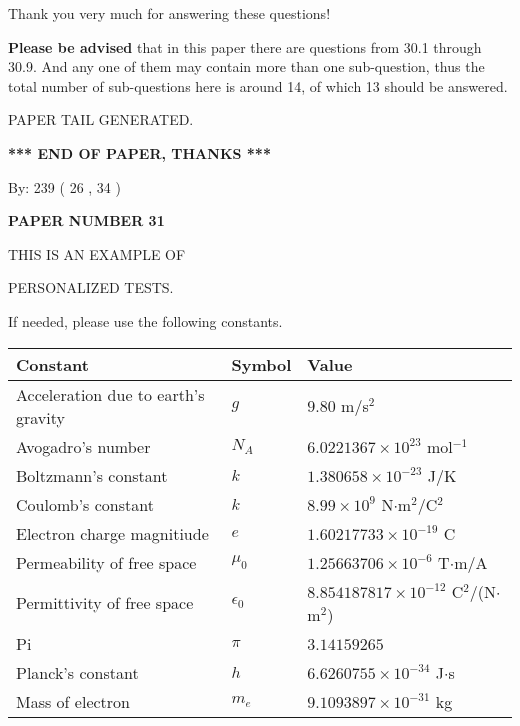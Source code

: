 \documentclass[12pt]{article}
\begin{document}
Thank you very much for answering these questions!
 
{\textbf{\large{Please be advised}}} that in this paper there are questions from
30.1 through
30.9.
And any one of them may contain more than one sub-question, thus the total number
of sub-questions here is around 14, of which
13 should be answered.
 
   
   
\vspace{2.0in} PAPER TAIL GENERATED.
   
   
   
   
\vspace{1.0in} 
{\textbf{\large{ *** END OF PAPER, THANKS *** }}} 
   
   
\hspace{1.0in} By: 
         239 (          26 ,           34 )
   
   
   
   
\newpage 
\setcounter{page}{ 
    31001 } 
   
   
   
   
 {\textbf{ \Large{ PAPER NUMBER           31  }}}
   
   
\vspace{0.2in}
   
   
   
   
   
   
   
   
 \vspace{0.2in}
 
 
{\Huge  THIS IS AN EXAMPLE OF}
 
{\Huge  PERSONALIZED TESTS. }
 
If needed, please use the following constants.
 
 
 
\noindent\begin{tabular}{|l|l|l|}
\hline
Constant & Symbol & Value \\
\hline
Acceleration due to earth's gravity &
$g$ &
 $ 9.80 $
m/s$^2$ \\
\hline
Avogadro's number &
$N_A$ &
 $ 6.0221367 \times 10^{23} $
mol$^{-1}$ \\
\hline
Boltzmann's constant &
$k$ &
 $ 1.380658 \times 10^{-23} $
J/K \\
\hline
Coulomb's constant &
$k$ &
 $ 8.99 \times 10^{9} $
N$\cdot $m$^2$/C$^2$ \\
\hline
Electron charge magnitiude &
$e$ &
 $ 1.60217733 \times 10^{-19} $
C \\
\hline
Permeability of free space &
$\mu _0$ &
 $ 1.25663706 \times 10^{-6} $
T$\cdot $m/A \\
\hline
Permittivity of free space &
$\epsilon _0$ &
 $ 8.854187817 \times 10^{-12} $
C$^2$/(N$\cdot $m$^2$) \\
\hline
Pi &
$\pi$ &
 $ 3.14159265 $
$ $ \\
\hline
Planck's constant &
$h$ &
 $ 6.6260755 \times 10^{-34} $
J$\cdot $s \\
\hline
Mass of electron &
$m_e$ &
 $ 9.1093897 \times 10^{-31} $
kg \\
\hline
\end{tabular}
 
\end{document}
